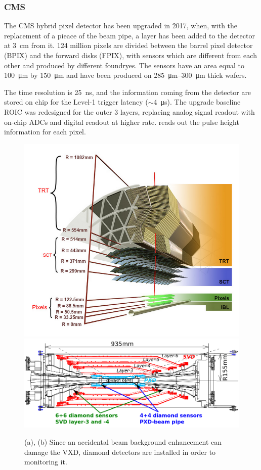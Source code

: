        \subsubsection{CMS}
        The CMS hybrid pixel detector has been upgraded in 2017, when, with the replacement of a pieace of the beam pipe, a layer has been added to the detector at \SI{3}{cm} from it.
        124 million pixels are divided between the barrel pixel detector (BPIX) and the forward disks (FPIX), with sensors which are different from each other and produced by different foundryes. 
        The sensors have an area equal to \SI{100}{\um} by \SI{150}{\um} and have been produced on \SIrange{285}{300}{\um} thick wafers.
    
        The time resolution is \SI{25}{ns}, and the information coming from the detector are stored on chip for the Level-1 trigger latency ($\sim$\SI{4}{\us}).   
        The upgrade baseline ROIC was redesigned for the outer 3 layers, replacing analog signal readout with on-chip ADCs and digital readout at higher rate. reads out the pulse height information for each pixel. 

\begin{figure}[h!]
            \centering
            \includegraphics[width=.49\linewidth]{figures/pixel_detectors_usage/ATLAS.png}
            \includegraphics[width=.49\linewidth]{figures/pixel_detectors_usage/SVD_Belle2.png}
            \caption{(a), (b) Since an accidental beam background enhancement can damage the VXD, diamond detectors are installed in order to monitoring it.}
            \label{fig:}
        \end{figure}

